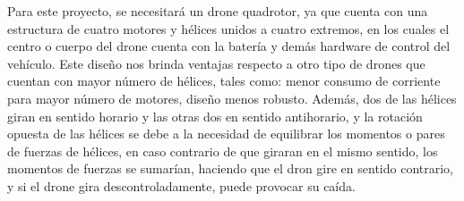 

Para este proyecto, se necesitará un drone quadrotor, ya que cuenta con una 
estructura de cuatro motores y hélices unidos a cuatro extremos, en los cuales 
el centro o cuerpo del drone cuenta con la batería y demás hardware de control 
del vehículo. Este diseño nos brinda ventajas respecto a otro tipo de drones que 
cuentan con mayor número de hélices, tales como: menor consumo de corriente para 
mayor número de motores, diseño menos robusto.  Además, dos de las hélices giran 
en sentido horario y las otras dos en sentido antihorario, y la rotación opuesta 
de las hélices se debe a la necesidad de equilibrar los momentos o pares de 
fuerzas de hélices, en caso contrario de que giraran en el mismo sentido, los 
momentos de fuerzas se sumarían, haciendo que el dron gire en sentido contrario, 
y si el drone gira descontroladamente, puede provocar su caída.
